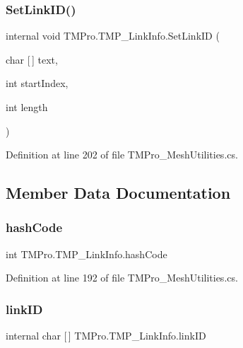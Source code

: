 \mbox{\label{struct_t_m_pro_1_1_t_m_p___link_info_a523ba1edb25ad8f18799dde7212fb271}} 
\subsubsection{\texorpdfstring{SetLinkID()}{SetLinkID()}}
{\footnotesize\ttfamily internal void T\+M\+Pro.\+T\+M\+P\+\_\+\+Link\+Info.\+Set\+Link\+ID (\begin{DoxyParamCaption}\item[{char \mbox{[}$\,$\mbox{]}}]{text,  }\item[{int}]{start\+Index,  }\item[{int}]{length }\end{DoxyParamCaption})}



Definition at line 202 of file T\+M\+Pro\+\_\+\+Mesh\+Utilities.\+cs.



\subsection{Member Data Documentation}
\mbox{\label{struct_t_m_pro_1_1_t_m_p___link_info_a1de6d96b1c5691402ed7b14765e6bef7}} 
\subsubsection{\texorpdfstring{hashCode}{hashCode}}
{\footnotesize\ttfamily int T\+M\+Pro.\+T\+M\+P\+\_\+\+Link\+Info.\+hash\+Code}



Definition at line 192 of file T\+M\+Pro\+\_\+\+Mesh\+Utilities.\+cs.

\mbox{\label{struct_t_m_pro_1_1_t_m_p___link_info_a4d4525004e3b9db0d88189809cbc80be}} 
\subsubsection{\texorpdfstring{linkID}{linkID}}
{\footnotesize\ttfamily internal char \mbox{[}$\,$\mbox{]} T\+M\+Pro.\+T\+M\+P\+\_\+\+Link\+Info.\+link\+ID}



